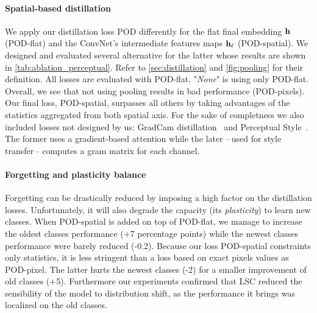 \paragraph{Spatial-based distillation} We apply our distillation loss POD differently for the flat
final embedding $\mathbf{h}$ (POD-flat) and the ConvNet's intermediate features maps $\mathbf{h}_\ell$
(POD-spatial). We designed and evaluated several alternative for the latter whose results are shown
in \autoref{tab:ablation_perceptual}. Refer to \autoref{sec:distillation} and \autoref{fig:pooling}
for their definition. All losses are evaluated with POD-flat. "\textit{None}" is using only
POD-flat.
Overall, we see that not using pooling results in bad performance (POD-pixels). Our final loss,
POD-spatial, surpasses all others by taking advantages of the statistics aggregated from both
spatial axis. For the sake of completness we also included losses not designed by us: GradCam
distillation~\citep{dhar2019learning_without_memorizing_gradcam} and Perceptual
Style~\citep{johnson2016perceptual_losses}. The former uses a gradient-based attention while the
later --\,used for style transfer\,-- computes a gram matrix for each channel.

\paragraph{Forgetting and plasticity balance} Forgetting can be drastically reduced by imposing a
high factor on the distillation losses. Unfortunately, it will also degrade the capacity (its
\textit{plasticity}) to learn new classes. When POD-spatial is added on top of POD-flat, we manage
to increase the oldest classes performance (+7 percentage points) while the newest classes
performance were barely reduced (-0.2\pp). Because our loss POD-spatial constraints only statistics,
it is less stringent than a loss based on exact pixels values as POD-pixel. The latter hurts the
newest classes (-2\pp) for a smaller improvement of old classes (+5\pp). Furthermore our experiments
confirmed that LSC reduced the sensibility of the model to distribution shift, as the performance it
brings was localized on the old classes.

